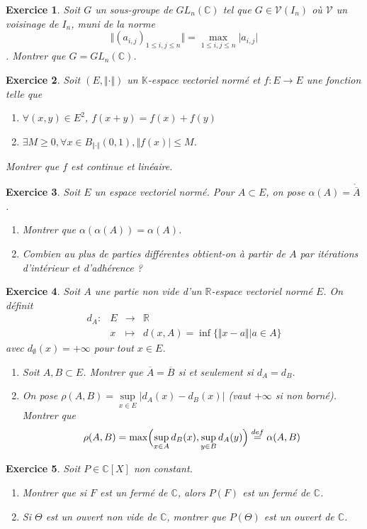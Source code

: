 \documentclass[12pt]{article}
\newtheorem{exercise}{Exercice}[section]
\theoremstyle{remark}
\theoremstyle{remark}
\newcommand{\K}{\mathbb{K}} \newcommand{\R}{\mathbb{R}}
\newcommand{\C}{\mathbb{C}} \newcommand{\Q}{\mathbb{Q}}
\newcommand{\function}[5]{
	$$
	\begin{array}{rccl}
		#1: & #2 & \to & #3 \\
		& #4 & \mapsto & #5
	\end{array}
	$$
}
\begin{document}
\begin{exercise}
	Soit $G$ un sous-groupe de $GL_{n}(\C)$ tel que $G\in\mathcal{V}(I_{n})$ où $\mathcal{V}$ un voisinage de $I_{n}$, muni de la norme 
	$$\Vert (a_{i,j})_{1\leqslant i,j\leqslant n}\Vert=\max\limits_{1\leqslant i,j\leqslant n}\vert a_{i,j}\vert$$. Montrer que $G=GL_{n}(\C)$.
\end{exercise}

\begin{exercise}
	Soit $(E,\Vert\cdot\Vert)$ un $\K$-espace vectoriel normé et $f:E\to E$ une fonction telle que 
	\begin{enumerate}
		\item [(i)] $\forall(x,y)\in E^{2}$, $f(x+y)=f(x)+f(y)$
		\item [(ii)] $\exists M\geqslant0,\forall x\in B_{\Vert\cdot\Vert}(0,1),\Vert f(x)\vert\leqslant M$.
	\end{enumerate}
	Montrer que $f$ est continue et linéaire.
\end{exercise}

\begin{exercise}
	Soit $E$ un espace vectoriel normé. Pour $A\subset E$, on pose $\alpha(A)=\mathring{\overline{A}}$.
	\begin{enumerate}
		\item Montrer que $\alpha(\alpha(A))=\alpha(A)$.
		\item Combien au plus de parties différentes obtient-on à partir de $A$ par itérations d'intérieur et d'adhérence ?
	\end{enumerate}
\end{exercise}

\begin{exercise}
	Soit $A$ une partie non vide d'un $\R$-espace vectoriel normé $E$. On définit \function{d_A}{E}{\R}{x}{d(x,A)=\inf\{\Vert x-a\Vert\big| a\in A\}} avec $d_{\emptyset}(x)=+\infty$ pour tout $x\in E$.
	\begin{enumerate}
		\item Soit $A,B\subset E$. Montrer que $\overline{A}=\overline{B}$ si et seulement si $d_{A}=d_{B}$.
		\item On pose $\rho(A,B)=\sup\limits_{x\in E}\vert d_{A}(x)-d_{B}(x)\vert$ (vaut $+\infty$ si non borné). Montrer que 
		$$\rho(A,B)=\max\Bigl(\sup\limits_{x\in A}d_{B}(x),\sup\limits_{y\in B}d_{A}(y)\Bigr)\overset{def}{=}\alpha(A,B)$$
	\end{enumerate}
\end{exercise}

\begin{exercise}
	Soit $P\in\C[X]$ non constant.
	\begin{enumerate}
		\item Montrer que si $F$ est un fermé de $\C$, alors $P(F)$ est un fermé de $\C$.
		\item Si $\Theta$ est un ouvert non vide de $\C$, montrer que $P(\Theta)$ est un ouvert de $\C$.
	\end{enumerate}
\end{exercise}
\end{document}
